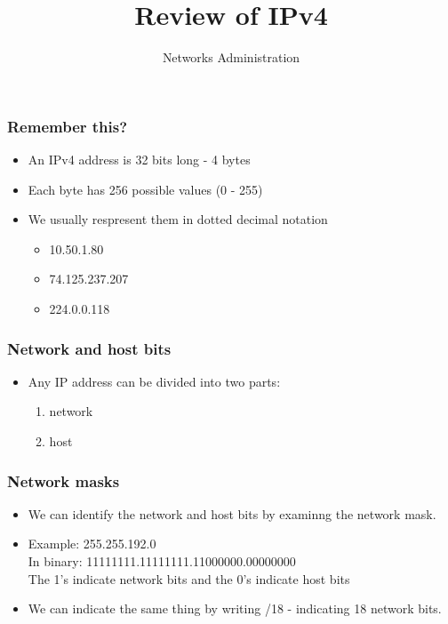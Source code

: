 \documentclass[10pt]{beamer}
\title{Review of IPv4}
\author[IN715]{Networks Administration}
\institute[Otago Polytechnic]{
  Otago Polytechnic \\
  Dunedin, New Zealand \\
}
\date{}
\begin{document}
\begin{frame}[plain]
  \titlepage
\end{frame}

\begin{frame}
  \frametitle{Remember this?}

 \begin{itemize}
  \item An IPv4 address is 32 bits long - 4 bytes
  \item Each byte has 256 possible values (0 - 255)
  \item We usually respresent them in dotted decimal notation 
        \begin{itemize}
          \item 10.50.1.80
          \item 74.125.237.207
          \item 224.0.0.118
        \end{itemize}
  \end{itemize}

\end{frame}


\begin{frame}
  \frametitle{Network and host bits}

 \begin{itemize}
  \item Any IP address can be divided into two parts:
        \begin{enumerate}
          \item network
          \item host
        \end{enumerate}
  
 \end{itemize}

\end{frame}


\begin{frame}
  \frametitle{Network masks}
 \begin{itemize}
  \item We can identify the network and host bits by examinng the network mask.
  \item Example: 255.255.192.0 \\
        In binary:  11111111.11111111.11000000.00000000 \\
        The 1's indicate network bits and the 0's indicate host bits
  \item We can indicate the same thing by writing /18 - indicating 18 network bits.
 \end{itemize}

\end{frame}
\end{document}
